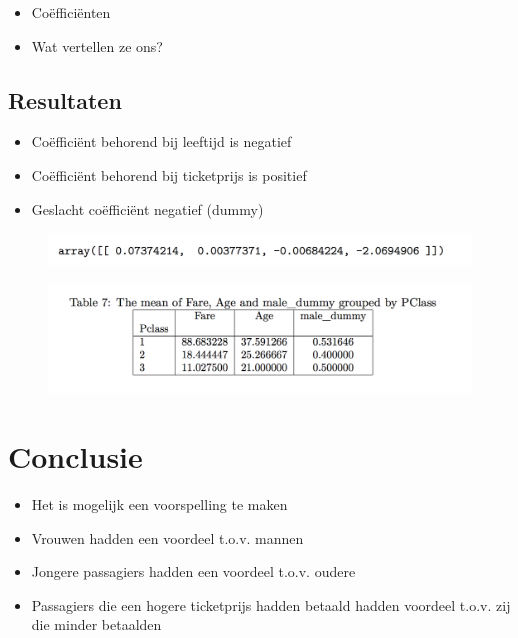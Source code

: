 \documentclass[11pt]{article}
\begin{document}
\begin{itemize}
\item Coëfficiënten
\item Wat vertellen ze ons?
\end{itemize}

\subsection*{Resultaten}
\label{sec:org69dae9f}
\begin{itemize}
\item Coëfficiënt behorend bij leeftijd is negatief
\item Coëfficiënt behorend bij ticketprijs is positief
\item Geslacht coëfficiënt negatief (dummy)
\end{itemize}


\begin{figure}[htbp]
\centering
\includegraphics[width=600]{./coefficients.png}
\caption{}
\end{figure}

\begin{figure}[htbp]
\centering
\includegraphics[width=600]{./Table7.png}
\caption{}
\end{figure}

\section*{Conclusie}
\label{sec:org3a799b0}

\begin{itemize}
\item Het is mogelijk een voorspelling te maken
\item Vrouwen hadden een voordeel t.o.v. mannen
\item Jongere passagiers hadden een voordeel t.o.v. oudere
\item Passagiers die een hogere ticketprijs hadden betaald hadden voordeel t.o.v. zij die minder betaalden
\end{itemize}
\end{document}

